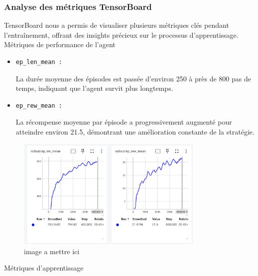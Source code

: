 \documentclass{article}
\begin{document}
    \subsubsection{Analyse des métriques TensorBoard}
    
    \quad TensorBoard nous a permis de visualiser plusieurs métriques clés pendant l'entraînement, offrant des insights précieux sur le processus d'apprentissage.\\

        Métriques de performance de l'agent
        
        \begin{itemize} 
            \item \begin{verbatim}ep_len_mean :\end{verbatim}La durée moyenne des épisodes est passée d'environ 250 à près de 800 pas de temps, indiquant que l'agent survit plus longtemps.
            \item \begin{verbatim}ep_rew_mean :\end{verbatim}La récompense moyenne par épisode a progressivement augmenté pour atteindre environ 21.5, démontrant une amélioration constante de la stratégie.
        \end{itemize}
        
        \begin{figure}[ht]
            \centering
            \includegraphics[width=0.8\textwidth]{7.png}
            \caption{image a mettre ici}
        \end{figure}
    
        Métriques d'apprentissage
        
\end{document}
